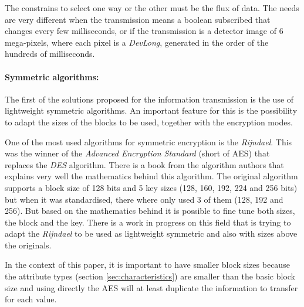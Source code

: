 \documentclass[10pt,a4paper,twoside]{llncs}
\begin{document}
The constrains to select one way or the other must be the flux of data. The needs are very different when the transmission means a boolean subscribed that changes every few milliseconds, or if the transmission is a detector image of 6 mega-pixels, where each pixel is a \emph{DevLong}, generated in the order of the hundreds of milliseconds.

\paragraph{Symmetric algorithms:} The first of the solutions proposed for the information transmission is the use of lightweight symmetric algorithms. An important feature for this is the possibility to adapt the sizes of the blocks to be used, together with the encryption modes.

One of the most used algorithms for symmetric encryption is the \emph{Rijndael}. This was the winner of the \emph{Advanced Encryption Standard} (short of AES) \cite{AES-FIPS} that replaces the \emph{DES} algorithm. There is a book \cite{Daemen:2002:DR:560131} from the algorithm authors that explains very well the mathematics behind this algorithm. The original algorithm supports a block size of 128 bits and 5 key sizes (128, 160, 192, 224 and 256 bits) but when it was standardised, there where only used 3 of them (128, 192 and 256). But based on the mathematics behind it is possible to fine tune both sizes, the block and the key. There is a work in progress on this field \cite{gRijndael} that is trying to adapt the \emph{Rijndael} to be used as lightweight symmetric and also with sizes above the originals.

In the context of this paper, it is important to have smaller block sizes because the attribute types (section \ref{sec:characteristics}) are smaller than the basic block size and using directly the AES will at least duplicate the information to transfer for each value. 
\end{document}
